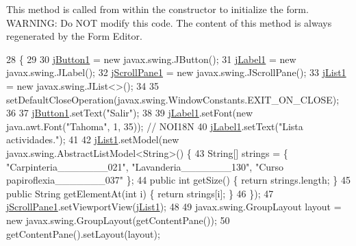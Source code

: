 This method is called from within the constructor to initialize the form. W\+A\+R\+N\+I\+NG\+: Do N\+OT modify this code. The content of this method is always regenerated by the Form Editor. 
\begin{DoxyCode}
28                                   \{
29 
30         \mbox{\hyperlink{classsoftware_1_1parasoftware6_a82af1fccb2dc3615434e773e93577e3e}{jButton1}} = \textcolor{keyword}{new} javax.swing.JButton();
31         \mbox{\hyperlink{classsoftware_1_1parasoftware6_a4c4a13bf028651697609279d113c6103}{jLabel1}} = \textcolor{keyword}{new} javax.swing.JLabel();
32         \mbox{\hyperlink{classsoftware_1_1parasoftware6_a1ce3e9e74a88099c65ad960cee26aa87}{jScrollPane1}} = \textcolor{keyword}{new} javax.swing.JScrollPane();
33         \mbox{\hyperlink{classsoftware_1_1parasoftware6_a591d2c040c5b906d0df174fa5ae460dc}{jList1}} = \textcolor{keyword}{new} javax.swing.JList<>();
34 
35         setDefaultCloseOperation(javax.swing.WindowConstants.EXIT\_ON\_CLOSE);
36 
37         \mbox{\hyperlink{classsoftware_1_1parasoftware6_a82af1fccb2dc3615434e773e93577e3e}{jButton1}}.setText(\textcolor{stringliteral}{"Salir"});
38 
39         \mbox{\hyperlink{classsoftware_1_1parasoftware6_a4c4a13bf028651697609279d113c6103}{jLabel1}}.setFont(\textcolor{keyword}{new} java.awt.Font(\textcolor{stringliteral}{"Tahoma"}, 1, 35)); \textcolor{comment}{// NOI18N}
40         \mbox{\hyperlink{classsoftware_1_1parasoftware6_a4c4a13bf028651697609279d113c6103}{jLabel1}}.setText(\textcolor{stringliteral}{"Lista actividades."});
41 
42         \mbox{\hyperlink{classsoftware_1_1parasoftware6_a591d2c040c5b906d0df174fa5ae460dc}{jList1}}.setModel(\textcolor{keyword}{new} javax.swing.AbstractListModel<String>() \{
43             String[] strings = \{ \textcolor{stringliteral}{"Carpinteria\_\_\_\_\_\_\_021"}, \textcolor{stringliteral}{"Lavanderia\_\_\_\_\_\_\_130"}, \textcolor{stringliteral}{"Curso
       papiroflexia\_\_\_\_\_\_\_037"} \};
44             \textcolor{keyword}{public} \textcolor{keywordtype}{int} getSize() \{ \textcolor{keywordflow}{return} strings.length; \}
45             \textcolor{keyword}{public} String getElementAt(\textcolor{keywordtype}{int} i) \{ \textcolor{keywordflow}{return} strings[i]; \}
46         \});
47         \mbox{\hyperlink{classsoftware_1_1parasoftware6_a1ce3e9e74a88099c65ad960cee26aa87}{jScrollPane1}}.setViewportView(\mbox{\hyperlink{classsoftware_1_1parasoftware6_a591d2c040c5b906d0df174fa5ae460dc}{jList1}});
48 
49         javax.swing.GroupLayout layout = \textcolor{keyword}{new} javax.swing.GroupLayout(getContentPane());
50         getContentPane().setLayout(layout);

\end{DoxyCode}
